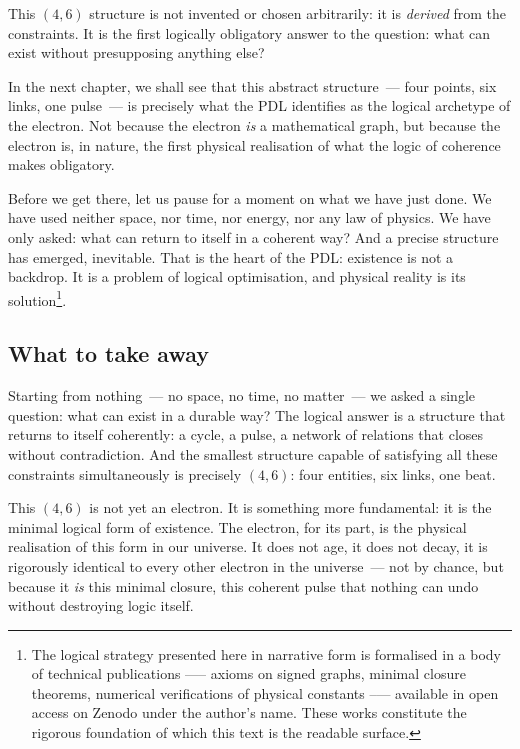 \documentclass[12pt, a4paper, openright]{book}
\begin{document}
\medskip

This $(4,6)$ structure is not invented or chosen arbitrarily: it is \emph{derived} from the constraints. It is the first logically obligatory answer to the question: what can exist without presupposing anything else?

\medskip

In the next chapter, we shall see that this abstract structure~--- four points, six links, one pulse~--- is precisely what the PDL identifies as the logical archetype of the electron. Not because the electron \emph{is} a mathematical graph, but because the electron is, in nature, the first physical realisation of what the logic of coherence makes obligatory.

\medskip

Before we get there, let us pause for a moment on what we have just done. We have used neither space, nor time, nor energy, nor any law of physics. We have only asked: what can return to itself in a coherent way? And a precise structure has emerged, inevitable. That is the heart of the PDL: existence is not a backdrop. It is a problem of logical optimisation, and physical reality is its solution\footnote{The logical strategy presented here in narrative form is formalised in a body of technical publications —-- axioms on signed graphs, minimal closure theorems, numerical verifications of physical constants --— available in open access on Zenodo under the author's name. These works constitute the rigorous foundation of which this text is the readable surface.}. 

\subsection*{What to take away}

Starting from nothing~--- no space, no time, no matter~--- we asked a single question: what can exist in a durable way? The logical answer is a structure that returns to itself coherently: a cycle, a pulse, a network of relations that closes without contradiction. And the smallest structure capable of satisfying all these constraints simultaneously is precisely $(4,6)$: four entities, six links, one beat.

\medskip

This $(4,6)$ is not yet an electron. It is something more fundamental: it is the minimal logical form of existence. The electron, for its part, is the physical realisation of this form in our universe. It does not age, it does not decay, it is rigorously identical to every other electron in the universe~--- not by chance, but because it \emph{is} this minimal closure, this coherent pulse that nothing can undo without destroying logic itself.
\end{document}
